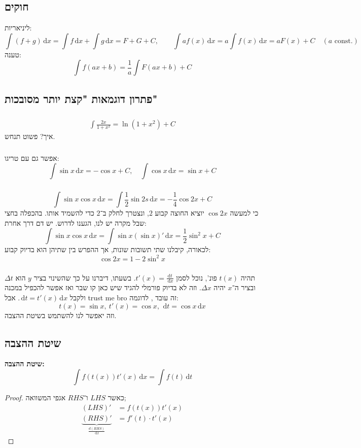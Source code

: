 \documentclass[]{article}
\newcommand\cosx  {\cos x}
\newcommand\sinx  {\sin x}
\newcommand\dx    {\,\mathrm{d}x}
\newcommand\dt    {\,\mathrm{d}t}
\begin{document}
	\subsection{חוקים}
	ליניאריות: 
	\[ \int (f + g) \dx = \int f \dx + \int g \dx = F + G + C, \quad \quad \int af(x) \dx = a \int f(x) \dx = aF(x) + C \quad (a \text{ const.}) \]
	טענה: 
	\[ \int f(ax + b) = \frac{1}{a}\int F(ax + b) + C \]
	
	\subsection{פתרון דוגמאות "קצת יותר מסובכות"}
	\subsubsection{}
	\begin{align}
		\int \frac{2x}{1 + x^2} = \ln (1 + x^2) + C
	\end{align}
	איך? פשוט תנחש. 
	\subsubsection{}
	אפשר גם עם טריגו: 
	\[ \int \sinx \dx = - \cosx + C, \quad \int \cosx \dx = \sinx + C \]
	
	\subsubsection{}
	\[ \int \sinx \cosx \dx = \int \frac{1}{2}\sin 2s \dx = -\frac{1}{4}\cos 2x + C \]
	כי למעשה $\cos 2x$ יוציא החוצה קבוע $2$, ונצטרך לחלק ב־$2$ כדי להשמיד אותו. בהכפלה בחצי שבל מקרה יש לנו, הגענו לדרוש. יש דם דרך אחרת: 
	\[ \int \sinx \cosx \dx = \int \sinx (\sinx)' \dx = \frac{1}{2}\sin^2x + C \]
	לכאורה, קיבלנו שתי תשובות שונות, אך ההפרש בין שתיהן הוא בדיוק קבוע: 
	\[ \cos 2x = 1 - 2 \sin^2x \]
	\subsubsection{}
	תהיה $t(x)$ פונ', נוכל לסמן $t'(x) = \frac{\mathrm{d}t}{\dx}$. בשעתו, דיברנו על כך שהשינוי בציר $y$ הוא $\Delta t$ ובציר ה־$x$ יהיה $\Delta x$. וזה לא בדיוק פורמלי להגיד שיש כאן קו שבר ואז אפשר להכפיל במכנה ולקבל $\dt = t'(x) \dx$. אבל trust me bro זה עובד , לדוגמה: 
	\[ t(x) = \sinx, \ t'(x) = \cosx, \ \dt = \cosx \dx \]
	וזה יאפשר לנו להשתמש בשיטת ההצבה. 
	
	\subsection{שיטת ההצבה}
	\textbf{שיטת ההצבה: }
	\[ \int f(t(x))t'(x)\dx = \int f(t) \dt \]
	\begin{proof}
		כאשר $LHS$ ו־$RHS$ אגפי המשוואה;
		\begin{align}
			(LHS)' &= f(t(x))t'(x) \\
			\underbrace{(RHS)'}_{\displaystyle\frac{d(RHS)}{\dx}} &= f'(t) \cdot t'(x)
		\end{align}
	\end{proof}
	
\end{document}
